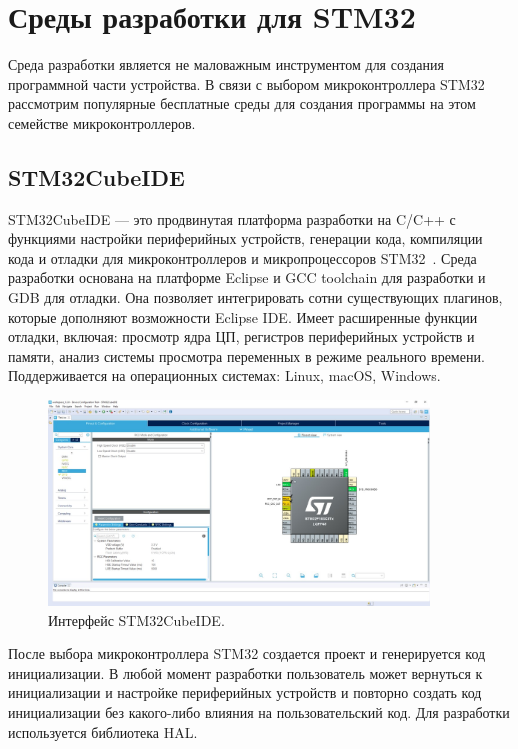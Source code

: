 \section{Среды разработки для STM32}

	Среда разработки является не маловажным инструментом для создания программной части устройства. В связи с выбором микроконтроллера STM32 рассмотрим популярные бесплатные среды для создания программы на этом семействе микроконтроллеров.

\subsection{STM32CubeIDE}

	
	STM32CubeIDE --- это продвинутая платформа разработки на C/C++ с функциями настройки периферийных устройств, генерации кода, компиляции кода и отладки для микроконтроллеров и микропроцессоров STM32~\cite{cube}. Среда разработки основана на платформе Eclipse и GCC toolchain для разработки и GDB для отладки. Она позволяет интегрировать сотни существующих плагинов, которые дополняют возможности Eclipse IDE. Имеет расширенные функции отладки, включая: просмотр ядра ЦП, регистров периферийных устройств и памяти, анализ системы просмотра переменных в режиме реального времени. Поддерживается на операционных системах: Linux, macOS, Windows.
	
	\begin{figure}[h]
    \centering
    \includegraphics[width=0.9\textwidth]{../image/cube.jpg}
    \caption{Интерфейс STM32CubeIDE.}
	\end{figure}
	
	После выбора микроконтроллера STM32 создается проект и генерируется код инициализации. В любой момент разработки пользователь может вернуться к инициализации и настройке периферийных устройств и повторно создать код инициализации без какого-либо влияния на пользовательский код. Для разработки используется библиотека HAL. 
	

